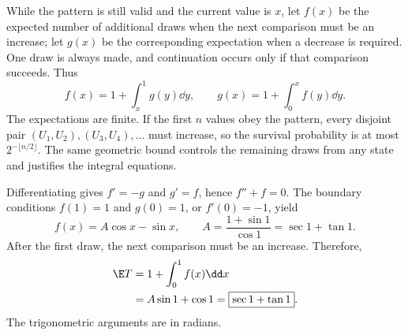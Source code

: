 While the pattern is still valid and the current value is $x$, let $f(x)$ be the expected number of additional draws when the next comparison must be an increase; let $g(x)$ be the corresponding expectation when a decrease is required. One draw is always made, and continuation occurs only if that comparison succeeds. Thus
\[
f(x)=1+\int_x^1g(y)\dd y,\qquad
 g(x)=1+\int_0^xf(y)\dd y.
\]
The expectations are finite. If the first $n$ values obey the pattern, every disjoint pair $(U_1,U_2),(U_3,U_4),\ldots$ must increase, so the survival probability is at most $2^{-\lfloor n/2\rfloor}$. The same geometric bound controls the remaining draws from any state and justifies the integral equations.

Differentiating gives $f'=-g$ and $g'=f$, hence $f''+f=0$. The boundary conditions $f(1)=1$ and $g(0)=1$, or $f'(0)=-1$, yield
\[
f(x)=A\cos x-\sin x,\qquad
A=\frac{1+\sin1}{\cos1}=\sec1+\tan1.
\]
After the first draw, the next comparison must be an increase. Therefore,
\[
\begin{aligned}
\E T&=1+\int_0^1f(x)\dd x\\
&=A\sin1+\cos1
=\boxed{\sec1+\tan1}.
\end{aligned}
\]
The trigonometric arguments are in radians.
